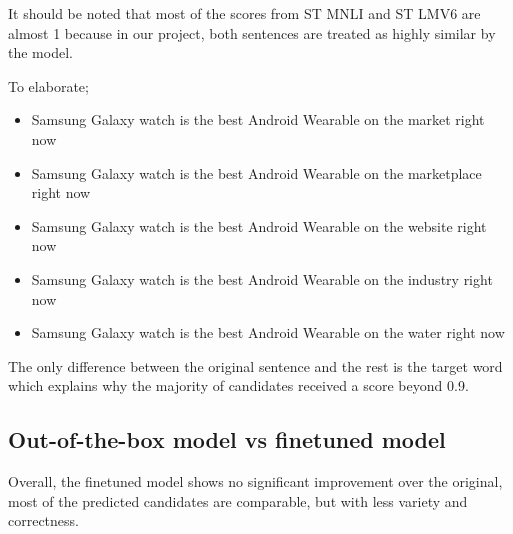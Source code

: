 \documentclass[12pt,oneside,openright,a4paper]{cpe-english-project}
\begin{document}
It should be noted that most of the scores from ST MNLI and ST LMV6 are almost 1 because in our project, both sentences are treated as highly similar by the model. 

To elaborate;
\begin{itemize}
\item Samsung Galaxy watch is the best Android Wearable on the market right now
\item Samsung Galaxy watch is the best Android Wearable on the marketplace right now
\item Samsung Galaxy watch is the best Android Wearable on the website right now
\item Samsung Galaxy watch is the best Android Wearable on the industry right now
\item Samsung Galaxy watch is the best Android Wearable on the water right now
\end{itemize}
The only difference between the original sentence and the rest is the target word which explains why the majority of candidates received a score beyond 0.9.

\subsection{Out-of-the-box model vs finetuned model}
Overall, the finetuned model shows no significant improvement over the original, most of the predicted candidates are comparable, but with less variety and correctness. 
\end{document}

